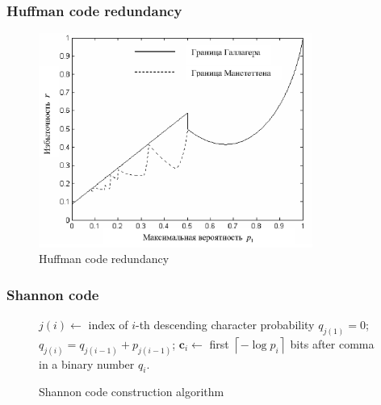 \documentclass[14pt]{beamer}
\renewcommand{\vec}[1]{\ensuremath{\boldsymbol{#1}}}
\begin{document}
\begin{frame}
\frametitle{Huffman code redundancy}
\begin{itemize}    

    \begin{center}
    \begin{figure}[htbp]
    \centerline{
    \includegraphics[width=0.8\textwidth]{fig2_5.eps}
    }
    \caption{Huffman code redundancy} \label{HUF_RED}
    \end{figure}
    \end{center}

\end{itemize}
\end{frame}


\begin{frame}
\frametitle{Shannon code}
\begin{itemize}    
    
    \begin{center}
    \begin{figure}
    \scalebox{0.70} {
    \begin{algorithm}[H]
    \dontprintsemicolon
      \BlankLine
      {
      $j(i)\leftarrow$ index of $i$-th descending character probability
      }
      \BlankLine
      $q_{j(1)}=0$;
      {
      $q_{j(i)}=q_{j(i-1)}+p_{j(i-1)}$;
      }
      \BlankLine
      {
      $\vec c_i\leftarrow $ first
      $\left\lceil { - \log p_i } \right\rceil $ bits after comma in a binary number $q_i$.
      }
    \end{algorithm}
    }
    \caption{Shannon code construction algorithm}
    \label{alg_sh}
    
    \end{figure}
    \end{center}

\end{itemize}
\end{frame}
\end{document}
